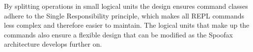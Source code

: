 By splitting operations in small logical units the design ensures command
classes adhere to the Single Responsibility principle, which makes all REPL
commands less complex and therefore easier to maintain. The logical units that
make up the commands also ensure a flexible design that can be modified
as the Spoofax architecture develops further on.

%
%
